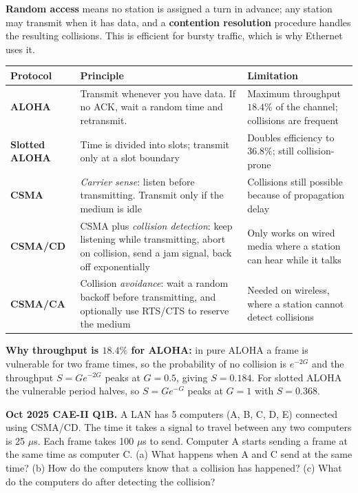 \documentclass[11pt,a4paper]{article}
\begin{document}
\begin{solbox}
\textbf{Random access} means no station is assigned a turn in advance; any station may transmit when it has data, and a \textbf{contention resolution} procedure handles the resulting collisions. This is efficient for bursty traffic, which is why Ethernet uses it.

\begin{center}\small
\begin{tabularx}{\textwidth}{>{\bfseries}p{} X p{}}
\toprule Protocol & Principle & Limitation\\
\midrule
ALOHA & Transmit whenever you have data. If no ACK, wait a random time and retransmit. & Maximum throughput $18.4\%$ of the channel; collisions are frequent\\
Slotted ALOHA & Time is divided into slots; transmit only at a slot boundary & Doubles efficiency to $36.8\%$; still collision-prone\\
CSMA & \emph{Carrier sense}: listen before transmitting. Transmit only if the medium is idle & Collisions still possible because of propagation delay\\
CSMA/CD & CSMA plus \emph{collision detection}: keep listening while transmitting, abort on collision, send a jam signal, back off exponentially & Only works on wired media where a station can hear while it talks\\
CSMA/CA & Collision \emph{avoidance}: wait a random backoff before transmitting, and optionally use RTS/CTS to reserve the medium & Needed on wireless, where a station cannot detect collisions\\
\bottomrule
\end{tabularx}
\end{center}

\textbf{Why throughput is $18.4\%$ for ALOHA:} in pure ALOHA a frame is vulnerable for two frame times, so the probability of no collision is $e^{-2G}$ and the throughput $S = Ge^{-2G}$ peaks at $G = 0.5$, giving $S = 0.184$. For slotted ALOHA the vulnerable period halves, so $S = Ge^{-G}$ peaks at $G = 1$ with $S = 0.368$.
\end{solbox}

\begin{pyqbox}
\textbf{Oct 2025 CAE-II Q1B.} A LAN has 5 computers (A, B, C, D, E) connected using CSMA/CD. The time it takes a signal to travel between any two computers is 25 $\mu$s. Each frame takes 100 $\mu$s to send. Computer A starts sending a frame at the same time as computer C. (a) What happens when A and C send at the same time? (b) How do the computers know that a collision has happened? (c) What do the computers do after detecting the collision?
\end{pyqbox}
\end{document}
